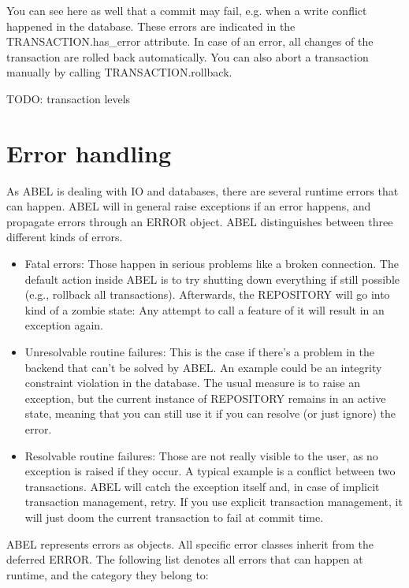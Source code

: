 You can see here as well that a commit may fail, e.g. when a write conflict happened in the database.
These errors are indicated in the TRANSACTION.has\_error attribute.
In case of an error, all changes of the transaction are rolled back automatically.
You can also abort a transaction manually by calling TRANSACTION.rollback. 


TODO: transaction levels



\section{Error handling}

As ABEL is dealing with IO and databases, there are several runtime errors that can happen. 
ABEL will in general raise exceptions if an error happens, and propagate errors through an ERROR object.
ABEL distinguishes between three different kinds of errors.

\begin{itemize}
\item Fatal errors: Those happen in serious problems like a broken connection. 
The default action inside ABEL is to try shutting down everything if still possible (e.g., rollback all transactions). 
Afterwards, the REPOSITORY will go into kind of a zombie state: 
Any attempt to call a feature of it will result in an exception again.
\item Unresolvable routine failures: This is the case if there's a problem in the backend that can't be solved by ABEL.
An example could be an integrity constraint violation in the database. 
The usual measure is to raise an exception, but the current instance of REPOSITORY remains in an active state, meaning that you can still use it if you can resolve (or just ignore) the error.
\item Resolvable routine failures: Those are not really visible to the user, as no exception is raised if they occur.
A typical example is a conflict between two transactions.
ABEL will catch the exception itself and, in case of implicit transaction management, retry.
If you use explicit transaction management, it will just doom the current transaction to fail at commit time.
\end{itemize}

ABEL represents errors as objects. 
All specific error classes inherit from the deferred ERROR.
The following list denotes all errors that can happen at runtime, and the category they belong to:

